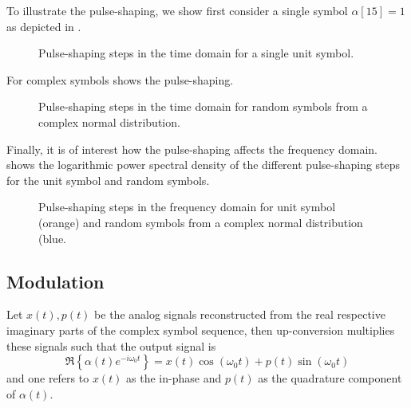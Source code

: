 To illustrate the pulse-shaping, we show first consider a single symbol $\alpha[15]=1$ as depicted in .
\begin{figure}[htb]
	\centering
	
	\caption{Pulse-shaping steps in the time domain for a single unit symbol.}\label{fig:pulse_shaping_unit_time}
\end{figure}
For complex symbols  shows the pulse-shaping.
\begin{figure}[htb]
	\centering
	
	\caption{Pulse-shaping steps in the time domain for random symbols from a complex normal distribution.}\label{fig:pulse_shaping_rand_time}
\end{figure}
Finally, it is of interest how the pulse-shaping affects the frequency domain.
 shows the logarithmic power spectral density of the different pulse-shaping steps for the unit symbol and random symbols.
\begin{figure}[htb]
	\centering
	
	\caption{Pulse-shaping steps in the frequency domain for unit symbol (orange) and random symbols from a complex normal distribution (blue.}\label{fig:pulse_shaping_freq}
\end{figure}
\FloatBarrier

\subsection{Modulation}

Let $x(t),p(t)$ be the analog signals reconstructed from the real respective imaginary parts of the complex symbol sequence, then up-conversion multiplies these signals such that the output signal is~\cite[p.~25]{Madhow2008}
\begin{equation}
	\Re\left\{
		\alpha(t)
		e^{-i\omega_0t}
	\right\}
	=
	x(t)
	\cos(\omega_0t)
	+
	p(t)
	\sin(\omega_0t)
\end{equation}
and one refers to $x(t)$ as the in-phase and $p(t)$ as the quadrature component of $\alpha(t)$.

